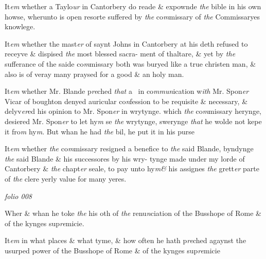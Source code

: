 \documentclass[12pt, a4paper]{book}
\begin{document}
		\ifthenelse{\isodd{\thepage}}
		{\reversemarginpar}
		{\normalmarginpar}
		 It\textit{em} whether a Taylo\textit{ur} in Cantorbery do reade \& expownde
 \textit{the} bible in his own howse, wherunto is open resorte
            			suffered by \textit{the} co\textit{m}missary of \textit{the} Commissaryes knowlege.
            		
		\ifthenelse{\isodd{\thepage}}
		{\reversemarginpar}
		{\normalmarginpar}
		It\textit{em} whether the mast\textit{er} of saynt Johns in Cantorbery at
 his deth refused to receyve \& dispised \textit{the} most blessed sacra-
 ment of thaltare, \& yet by \textit{the} sufferance of the saide co\textit{m}missary
 both was buryed like a true christen man, \& also is of veray
 many praysed for a good \& an holy man.

            		
		\ifthenelse{\isodd{\thepage}}
		{\reversemarginpar}
		{\normalmarginpar}
		It\textit{em} whether Mr. Blande p\textit{re}ched \textit{that} a  in co\textit{mmun}ication w\textit{ith} Mr.
            			Spon\textit{er} Vicar of boughton denyed auricular co\textit{n}fession to be
 requisite \& necessary, \& delyv\textit{er}ed his opinion to Mr. Spon\textit{er}
            			in wrytynge. which \textit{the} co\textit{m}missary herynge, desiered Mr. Spon\textit{er}
 to let hy\textit{m} se \textit{the} wrytynge, swerynge \textit{that} he wolde not kepe
 it fro\textit{m} hy\textit{m}. But whan he had \textit{the} bil, he put it in his
 purse

		\ifthenelse{\isodd{\thepage}}
		{\reversemarginpar}
		{\normalmarginpar}
		 It\textit{em} whether \textit{the} co\textit{m}missary resigned a benefice to \textit{the} said
	Blande, byndynge \textit{the} said Blande \& his successores by his wry-
	tynge made under my lorde of Cantorbery \& \textit{the} chapt\textit{er} seale,
 to pay unto hy\textit{m\&} his assignes \textit{the} grett\textit{er} parte of \textit{the} clere yerly
 value for many yeres.

\dotfill
					

\textit{folio 008}



		\ifthenelse{\isodd{\thepage}}
		{\reversemarginpar}
		{\normalmarginpar}
		Wher \& whan he toke \textit{the} his oth of \textit{the} renu\textit{n}ciation
 of the Busshope of Rome \& of the kynges sup\textit{re}micie.
 
		\ifthenelse{\isodd{\thepage}}
		{\reversemarginpar}
		{\normalmarginpar}
		It\textit{em} in what places \& what tyme, \& how often he hath
 p\textit{re}ched agaynst the usurped power of the Busshope of Rome
 \& of the kynges sup\textit{re}micie
 
\end{document}

